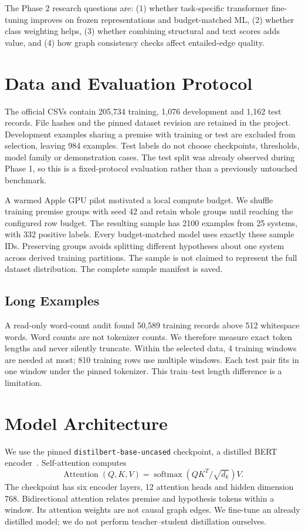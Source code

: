 \documentclass[conference]{IEEEtran}
\begin{document}
The Phase 2 research questions are: (1) whether task-specific transformer fine-tuning improves on frozen representations and budget-matched ML, (2) whether class weighting helps, (3) whether combining structural and text scores adds value, and (4) how graph consistency checks affect entailed-edge quality.

\section{Data and Evaluation Protocol}
The official CSVs contain 205,734 training, 1,076 development and 1,162 test records. File hashes and the pinned dataset revision are retained in the project. Development examples sharing a premise with training or test are excluded from selection, leaving 984 examples. Test labels do not choose checkpoints, thresholds, model family or demonstration cases. The test split was already observed during Phase 1, so this is a fixed-protocol evaluation rather than a previously untouched benchmark.

A warmed Apple GPU pilot motivated a local compute budget. We shuffle training premise groups with seed 42 and retain whole groups until reaching the configured row budget. The resulting sample has 2100 examples from 25 systems, with 332 positive labels. Every budget-matched model uses exactly these sample IDs. Preserving groups avoids splitting different hypotheses about one system across derived training partitions. The sample is not claimed to represent the full dataset distribution. The complete sample manifest is saved.

\subsection{Long Examples}
A read-only word-count audit found 50,589 training records above 512 whitespace words. Word counts are not tokenizer counts. We therefore measure exact token lengths and never silently truncate. Within the selected data, 4 training windows are needed at most; 810 training rows use multiple windows. Each test pair fits in one window under the pinned tokenizer. This train--test length difference is a limitation.

\section{Model Architecture}
We use the pinned \texttt{distilbert-base-uncased} checkpoint, a distilled BERT encoder~\cite{bert,distil}. Self-attention computes
\begin{equation}
\operatorname{Attention}(Q,K,V)=\operatorname{softmax}(QK^T/\sqrt{d_k})V.
\end{equation}
The checkpoint has six encoder layers, 12 attention heads and hidden dimension 768. Bidirectional attention relates premise and hypothesis tokens within a window. Its attention weights are not causal graph edges. We fine-tune an already distilled model; we do not perform teacher--student distillation ourselves.
\end{document}
